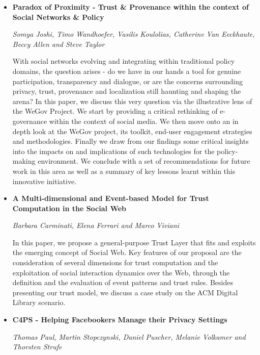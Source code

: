 \begin{itemize}
\item \textbf{Paradox of Proximity - Trust \& Provenance within the context of
Social Networks \& Policy}

\textit{Somya Joshi, Timo Wandhoefer, Vasilis Koulolias, Catherine Van
Eeckhaute, Beccy Allen and Steve Taylor}

With social networks evolving and integrating within traditional policy domains,
the question arises - do we have in our hands a tool for genuine participation,
transparency and dialogue, or are the concerns surrounding privacy, trust,
provenance and localization still haunting and shaping the arena? In this paper,
we discuss this very question via the illustrative lens of the WeGov Project. We
start by providing a critical rethinking of e-governance within the context of
social media. We then move onto an in depth look at the WeGov project, its
toolkit, end-user engagement strategies and methodologies. Finally we draw from
our findings some critical insights into the impacts on and implications of such
technologies for the policy-making environment. We conclude with a set of
recommendations for future work in this area as well as a summary of key lessons
learnt within this innovative initiative.

\item \textbf{A Multi-dimensional and Event-based Model for Trust Computation in
the Social Web}

\textit{Barbara Carminati, Elena Ferrari and Marco Viviani}

In this paper, we propose a general-purpose Trust Layer that fits and exploits
the emerging concept of Social Web. Key features of our proposal are the
consideration of several dimensions for trust computation and the exploitation
of social interaction dynamics over the Web, through the definition and the
evaluation of event patterns and trust rules. Besides presenting our trust
model, we discuss a case study on the ACM Digital Library scenario.

\item \textbf{C4PS - Helping Facebookers Manage their Privacy Settings}

\textit{Thomas Paul, Martin Stopczynski, Daniel Puscher, Melanie Volkamer and
Thorsten Strufe} 


\end{itemize}
